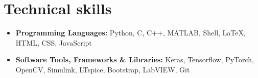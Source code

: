 \section{Technical skills}

\begin{itemize}

    \item \textbf{Programming Languages:} Python, C, C++, MATLAB, Shell, \LaTeX, HTML, CSS, JavaScript

    \item \textbf{Software Tools, Frameworks \& Libraries:} Keras,  Tensorflow, PyTorch, OpenCV, Simulink, LTspice, Bootstrap, LabVIEW, Git

\end{itemize}